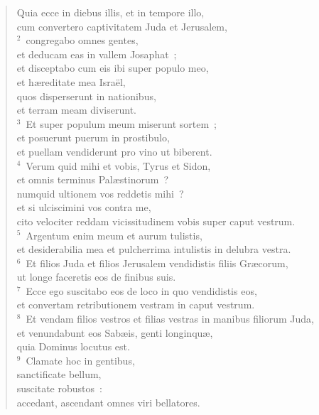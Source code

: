 \begin{flushleft}\begin{verse}\vspace{-19pt}Quia ecce in diebus illis, et in tempore illo,\\ cum convertero captivitatem Juda et Jerusalem,\\
${}^{2}$~congregabo omnes gentes,\\ et deducam eas in vallem Josaphat~;\\ et disceptabo cum eis ibi super populo meo,\\ et h\ae reditate mea Isra\"el,\\ quos disperserunt in nationibus,\\ et terram meam diviserunt.\\
${}^{3}$~Et super populum meum miserunt sortem~;\\ et posuerunt puerum in prostibulo,\\ et puellam vendiderunt pro vino ut biberent.\\
${}^{4}$~Verum quid mihi et vobis, Tyrus et Sidon,\\ et omnis terminus Pal\ae stinorum~?\\ numquid ultionem vos reddetis mihi~?\\ et si ulciscimini vos contra me,\\ cito velociter reddam vicissitudinem vobis super caput vestrum.\\
${}^{5}$~Argentum enim meum et aurum tulistis,\\ et desiderabilia mea et pulcherrima intulistis in delubra vestra.\\
${}^{6}$~Et filios Juda et filios Jerusalem vendidistis filiis Gr\ae corum,\\ ut longe faceretis eos de finibus suis.\\
${}^{7}$~Ecce ego suscitabo eos de loco in quo vendidistis eos,\\ et convertam retributionem vestram in caput vestrum.\\
${}^{8}$~Et vendam filios vestros et filias vestras in manibus filiorum Juda,\\ et venundabunt eos Sab\ae is, genti longinqu\ae ,\\ quia Dominus locutus est.\\
${}^{9}$~Clamate hoc in gentibus,\\ sanctificate bellum,\\ suscitate robustos~:\\ accedant, ascendant omnes viri bellatores.\\

\end{verse}
\end{flushleft}

